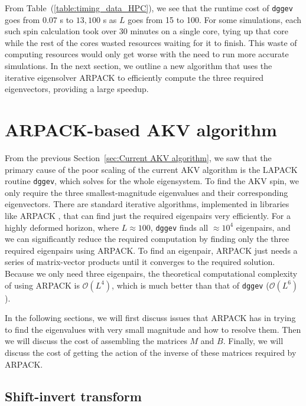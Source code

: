 \documentclass{iopjournal}
\begin{document}
From Table~(\ref{table:timing_data_HPC}), we see that the runtime cost of \texttt{dggev} goes from $0.07$ s to $13{,}100$ s as $L$ goes from 15 to 100.
For some simulations, each such spin calculation took over 30 minutes on a single core, tying up that core while the rest of the cores wasted resources waiting for it to finish. This waste of computing resources would only get worse with the need to run more accurate simulations. In the next section, we outline a new algorithm that uses the iterative eigensolver ARPACK to efficiently compute the three required eigenvectors, providing a large speedup.

\section{\label{sec:Sparse AKV algorithm} ARPACK-based AKV algorithm}

From the previous Section~\ref{sec:Current AKV algorithm}, we saw that the primary cause of the poor scaling of the current AKV algorithm is the LAPACK routine \texttt{dggev}, which solves for the whole eigensystem. To find the AKV spin, we only require the three smallest-magnitude eigenvalues and their corresponding eigenvectors. There are standard iterative algorithms, implemented in libraries like ARPACK \cite{arpack_guide}, that can find just the required eigenpairs very efficiently. For a highly deformed horizon, where $L\approx100$, \texttt{dggev} finds all $\approx 10^4$ eigenpairs, and we can significantly reduce the required computation by finding only the three required eigenpairs using ARPACK. To find an eigenpair, ARPACK just needs a series of matrix-vector products until it converges to the required solution. Because we only need three eigenpairs, the theoretical computational complexity of using ARPACK is $\mathcal{O}(L^4)$, which is much better than that of \texttt{dggev} ($\mathcal{O}(L^6)$).

In the following sections, we will first discuss issues that ARPACK has in trying to find the eigenvalues with very small magnitude and how to resolve them. Then we will discuss the cost of assembling the matrices $M$ and $B$. Finally, we will discuss the cost of getting the action of the inverse of these matrices required by ARPACK.

\subsection{\label{ssec:Shift Invert transform} Shift-invert transform}
\end{document}
